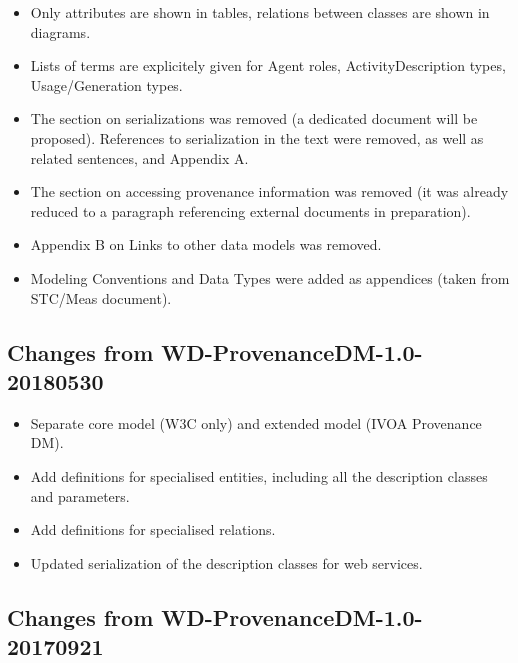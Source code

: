 \begin{itemize}
\item Only attributes are shown in tables, relations between classes are shown in diagrams.
\item Lists of terms are explicitely given for Agent roles, ActivityDescription types, Usage/Generation types.
\item The section on serializations was removed (a dedicated document will be proposed). References to serialization in the text were removed, as well as related sentences, and Appendix A.
\item The section on accessing provenance information was removed (it was already reduced to a paragraph referencing external documents in preparation).
\item Appendix B on Links to other data models was removed.
\item Modeling Conventions and Data Types were added as appendices (taken from STC/Meas document).
\end{itemize}


\subsection{Changes from WD-ProvenanceDM-1.0-20180530}

\begin{itemize}
\item Separate core model (W3C only) and extended model (IVOA Provenance DM).
\item Add definitions for specialised entities, including all the description classes and parameters.
\item Add definitions for specialised relations.
\item Updated serialization of the description classes for web services.
\end{itemize}


\subsection{Changes from WD-ProvenanceDM-1.0-20170921}

